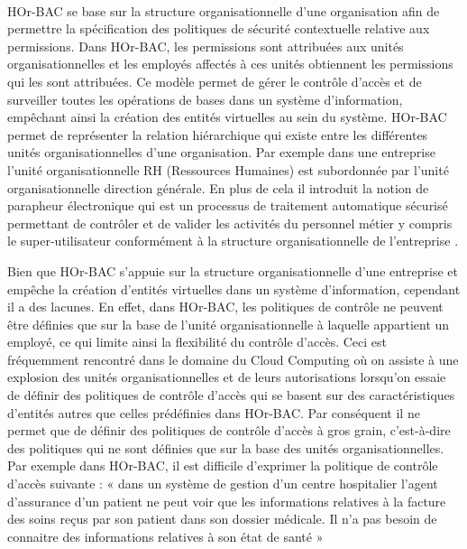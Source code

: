 \paragraph{} HOr-BAC se base sur la structure organisationnelle d'une organisation afin de permettre la spécification des politiques de sécurité contextuelle relative aux permissions. Dans HOr-BAC, les permissions sont attribuées aux unités organisationnelles et les employés affectés à ces unités obtiennent les permissions qui les sont attribuées. Ce modèle permet de gérer le contrôle d'accès et de surveiller toutes les opérations de bases dans un système d'information, empêchant ainsi la création des entités virtuelles au sein du système. HOr-BAC permet de représenter la relation hiérarchique qui existe entre les différentes unités organisationnelles d'une organisation. Par exemple dans une entreprise l'unité organisationnelle RH (Ressources Humaines) est subordonnée par l'unité organisationnelle direction générale. En plus de cela il introduit la notion de parapheur électronique qui est un processus de traitement automatique sécurisé permettant de contrôler et de valider les activités du personnel métier y compris le super-utilisateur conformément à la structure organisationnelle de l'entreprise \cite{theseBenoit}. 




 Bien que HOr-BAC s'appuie sur la structure organisationnelle d'une entreprise et empêche la création d'entités virtuelles dans un système d'information, cependant il a des lacunes. En effet, dans HOr-BAC, les politiques de contrôle ne peuvent être définies que sur la base de l'unité organisationnelle à laquelle appartient un employé, ce qui limite ainsi la flexibilité du contrôle d'accès. Ceci est  fréquemment rencontré  dans le domaine du Cloud Computing où on assiste à une explosion des unités organisationnelles et de leurs autorisations lorsqu'on essaie de définir des politiques de contrôle d'accès qui se basent sur des caractéristiques d'entités autres que celles prédéfinies dans HOr-BAC. Par conséquent il ne permet que de définir des politiques de contrôle d'accès à gros grain, c'est-à-dire des politiques qui ne sont définies que sur la base des unités organisationnelles. Par exemple dans HOr-BAC, il est difficile d'exprimer la politique de contrôle d'accès suivante : « dans un système de gestion d'un centre hospitalier l'agent d'assurance d'un patient ne peut voir que les informations relatives à la facture des soins reçus par son patient dans son dossier médicale. Il  n'a pas besoin de connaitre des informations relatives à son état de santé »

